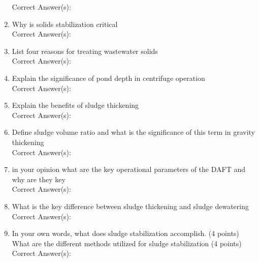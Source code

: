 \documentclass{article}
\begin{document}
\begin{enumerate}
Correct Answer(s): \\

\item  Why is solids stabilization critical \\

Correct Answer(s): \\

\item  List four reasons for treating wastewater solids \\

Correct Answer(s): \\

\item  Explain the significance of pond depth in centrifuge operation \\

Correct Answer(s): \\

\item  Explain the benefits of sludge thickening \\

Correct Answer(s): \\

\item  Define sludge volume ratio and what is the significance of this term in gravity thickening \\

Correct Answer(s): \\

\item  in your opinion what are the key operational parameters of the DAFT and why are they key \\

Correct Answer(s): \\

\item  What is the key difference between sludge thickening and sludge dewatering \\

Correct Answer(s): \\

\item  In your own words, what does sludge stabilization accomplish. (4 points)\\
What are the different methods utilized for sludge stabilization (4 points)\\

Correct Answer(s): \\


\end{enumerate}
\end{document}
